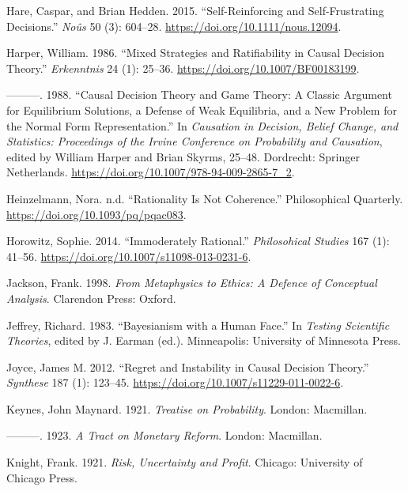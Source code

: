 \documentclass[
  12pt,
  letterpaper,
  DIV=11,
  numbers=noendperiod]{scrreprt}
\newlength{\cslhangindent}
\newenvironment{CSLReferences}[2] %
 {\begin{list}{}{%
  \setlength{\itemindent}{0pt}
  \setlength{\leftmargin}{0pt}
  \setlength{\parsep}{0pt}
  \ifodd #1
   \setlength{\leftmargin}{\cslhangindent}
   \setlength{\itemindent}{-1\cslhangindent}
  \fi
  \setlength{\itemsep}{#2\baselineskip}}}
 {\end{list}}
\begin{document}
\begin{CSLReferences}{1}{0}
Hare, Caspar, and Brian Hedden. 2015. {``Self-Reinforcing and
Self-Frustrating Decisions.''} \emph{Noûs} 50 (3): 604--28.
\url{https://doi.org/10.1111/nous.12094}.

Harper, William. 1986. {``Mixed Strategies and Ratifiability in Causal
Decision Theory.''} \emph{Erkenntnis} 24 (1): 25--36.
\url{https://doi.org/10.1007/BF00183199}.

---------. 1988. {``Causal Decision Theory and Game Theory: A Classic
Argument for Equilibrium Solutions, a Defense of Weak Equilibria, and a
New Problem for the Normal Form Representation.''} In \emph{Causation in
Decision, Belief Change, and Statistics: Proceedings of the Irvine
Conference on Probability and Causation}, edited by William Harper and
Brian Skyrms, 25--48. Dordrecht: Springer Netherlands.
\url{https://doi.org/10.1007/978-94-009-2865-7_2}.

Heinzelmann, Nora. n.d. {``Rationality Is Not Coherence.''}
Philosophical Quarterly. \url{https://doi.org/10.1093/pq/pqac083}.

Horowitz, Sophie. 2014. {``Immoderately Rational.''} \emph{Philosohical
Studies} 167 (1): 41--56.
\url{https://doi.org/10.1007/s11098-013-0231-6}.

Jackson, Frank. 1998. \emph{From Metaphysics to Ethics: A Defence of
Conceptual Analysis}. Clarendon Press: Oxford.

Jeffrey, Richard. 1983. {``Bayesianism with a Human Face.''} In
\emph{Testing Scientific Theories}, edited by J. Earman (ed.).
Minneapolis: University of Minnesota Press.

Joyce, James M. 2012. {``Regret and Instability in Causal Decision
Theory.''} \emph{Synthese} 187 (1): 123--45.
\url{https://doi.org/10.1007/s11229-011-0022-6}.

Keynes, John Maynard. 1921. \emph{Treatise on Probability}. London:
Macmillan.

---------. 1923. \emph{A Tract on Monetary Reform}. London: Macmillan.

Knight, Frank. 1921. \emph{Risk, Uncertainty and Profit}. Chicago:
University of Chicago Press.


\end{CSLReferences}
\end{document}
